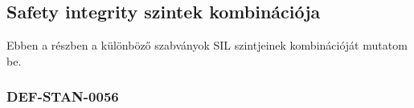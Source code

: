 \subsection{Safety integrity szintek kombinációja}
Ebben a részben a különböző szabványok SIL szintjeinek kombinációját mutatom be.

\subsubsection{DEF-STAN-0056}
